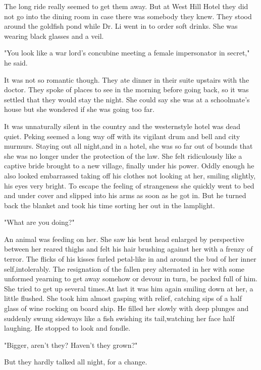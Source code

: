 \par The long ride really seemed to get them away. But at West Hill Hotel they did not go into the dining room in case there was somebody they knew. They stood around the goldfish pond while Dr. Li went in to order soft drinks. She was wearing black glasses and a veil.
\par "You look like a war lord's concubine meeting a female impersonator in secret," he said.
\par It was not so romantic though. They ate dinner in their suite upstairs with the doctor. They spoke of places to see in the morning before going back, so it was settled that they would stay the night. She could say she was at a schoolmate's house but she wondered if she was going too far.
\par It was unnaturally silent in the country and the westernstyle hotel was dead quiet. Peking seemed a long way off with its vigilant drum and bell and city murmurs. Staying out all night,and in a hotel, she was so far out of bounds that she was no longer under the protection of the law. She felt ridiculously like a captive bride brought to a new village, finally under his power. Oddly enough he also looked embarrassed taking off his clothes not looking at her, smiling slightly, his eyes very bright. To escape the feeling of strangeness she quickly went to bed and under cover and slipped into his arms as soon as he got in. But he turned back the blanket and took his time sorting her out in the lamplight.
\par "What are you doing?"
\par An animal was feeding on her. She saw his bent head enlarged by perspective between her reared thighs and felt his hair brushing against her with a frenzy of terror. The flicks of his kisses furled petal-like in and around the bud of her inner self,intolerably. The resignation of the fallen prey alternated in her with some unformed yearning to get away somehow or devour in turn, be packed full of him. She tried to get up several times.At last it was him again smiling down at her, a little flushed. She took him almost gasping with relief, catching sips of a half glass of wine rocking on board ship. He filled her slowly with deep plunges and suddenly swung sideways like a fish swishing its tail,watching her face half laughing. He stopped to look and fondle.
\par "Bigger, aren't they? Haven't they grown?"
\par But they hardly talked all night, for a change.




